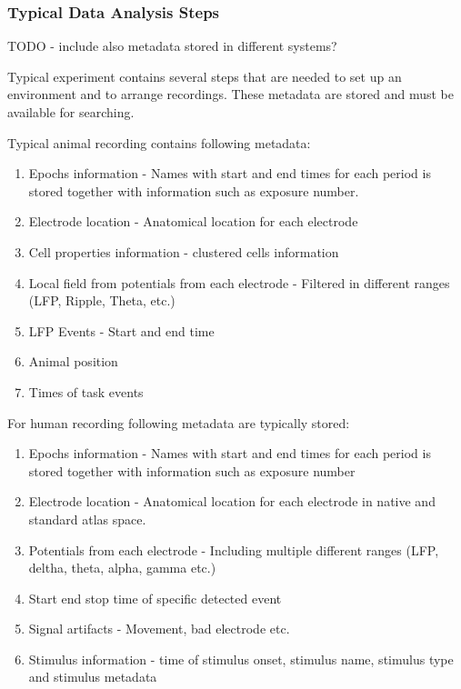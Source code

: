 \documentclass[utf8]{frontiersSCNS} %
\begin{document}
\subsubsection{Typical Data Analysis Steps}
\label{typical-data-analysis-steps}

TODO - include also metadata stored in different systems? 

Typical experiment contains several steps that are needed to set up an environment and to arrange recordings. These metadata are stored and must be available for searching. 

Typical animal recording contains following metadata:

\begin{enumerate}
 \item Epochs information - Names with start and end times for each period is stored together with information such as exposure number. 
 \item Electrode location - Anatomical location for each electrode
 \item Cell properties information - clustered cells information
 \item Local field from potentials from each electrode - Filtered in different ranges (LFP, Ripple, Theta, etc.)
 \item LFP Events - Start and end time
 \item Animal position
 \item Times of task events
\end{enumerate}

For human recording following metadata are typically stored:

\begin{enumerate}
 \item Epochs information - Names with start and end times for each period is stored together with information such as exposure number
 \item Electrode location - Anatomical location for each electrode in native and standard atlas space.
 \item Potentials from each electrode - Including multiple different ranges (LFP, deltha, theta, alpha, gamma etc.)
 \item Start end stop time of specific detected event
 \item Signal artifacts - Movement, bad electrode etc.
 \item Stimulus information - time of stimulus onset, stimulus name, stimulus type and stimulus metadata
\end{enumerate}
\end{document}
